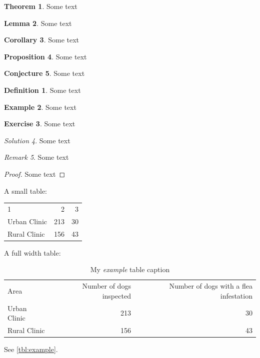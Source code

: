\documentclass{article}
\theoremstyle{definition}
\newtheorem{theorem}{Theorem}[subparagraph]
\newtheorem{lemma}[theorem]{Lemma}
\newtheorem{corollary}[theorem]{Corollary}
\newtheorem{proposition}[theorem]{Proposition}
\newtheorem{conjecture}[theorem]{Conjecture}
\newtheorem{definition}{Definition}
\newtheorem{example}[definition]{Example}
\newtheorem{exercise}[definition]{Exercise}
\theoremstyle{remark}
\newtheorem{solution}[definition]{Solution}
\newtheorem{remark}[definition]{Remark}
\begin{document}
\begin{theorem} Some text \end{theorem}
\begin{lemma} Some text \end{lemma}
\begin{corollary} Some text \end{corollary}
\begin{proposition} Some text \end{proposition}
\begin{conjecture} Some text \end{conjecture}
\begin{definition} Some text \end{definition}
\begin{example} Some text \end{example}
\begin{exercise} Some text \end{exercise}
\begin{solution} Some text \end{solution}
\begin{remark} Some text \end{remark}
\begin{proof} Some text \end{proof}

A small table:

\begin{tabular}{lrr}
  1 & 2 & 3 \\
  Urban Clinic & 213 & 30 \\
  Rural Clinic & 156 & 43 \\
\end{tabular}

A full width table:

\begin{table}[H]
  \caption{My \emph{example} table caption}
  \begin{tabular}{lrr}
    Area & Number of dogs inspected & Number of dogs with a flea infestation \\
    Urban Clinic & 213 & 30 \\
    Rural Clinic & 156 & 43 \\
  \end{tabular}
  \label{tbl:example}
\end{table}

See \autoref{tbl:example}.

\end{document}
